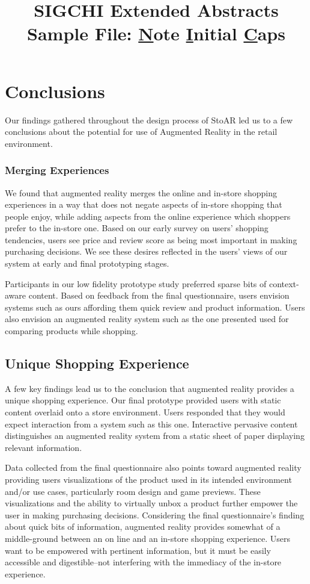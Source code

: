 \documentclass{sigchi-ext}
\begin{document}
\title{SIGCHI Extended Abstracts Sample File: \underline{N}ote
  \underline{I}nitial \underline{C}aps}

\section{Conclusions}

Our findings gathered throughout the design process of StoAR led us to a few conclusions about the potential for use of Augmented Reality in the retail environment.

\subsubsection{Merging Experiences}
We found that augmented reality merges the online and in-store shopping experiences in a way that does not negate aspects of in-store shopping that people enjoy, while adding aspects from the online experience which shoppers prefer to the in-store one.  Based on our early survey on users' shopping tendencies, users see price and review score as being most important in making purchasing decisions.  We see these desires reflected in the users' views of our system at early and final prototyping stages.

Participants in our low fidelity prototype study preferred sparse bits of context-aware content.  Based on feedback from the final questionnaire, users envision systems such as ours affording them quick review and product information.  Users also envision an augmented reality system such as the one presented used for comparing products while shopping.

\subsection{Unique Shopping Experience}
A few key findings lead us to the conclusion that augmented reality provides a unique shopping experience.  
Our final prototype provided users with static content overlaid onto a store environment.  Users responded that they would expect interaction from a system such as this one.  Interactive pervasive content distinguishes an augmented reality system from a static sheet of paper displaying relevant information.

Data collected from the final questionnaire also points toward augmented reality providing users visualizations of the product used in its intended environment and/or use cases, particularly room design and game previews.  These visualizations and the ability to virtually unbox a product further empower the user in making purchasing decisions.
Considering the final questionnaire's finding about quick bits of information, augmented reality provides somewhat of a middle-ground between an on line and an in-store shopping experience.  Users want to be empowered with pertinent information, but it must be easily accessible and digestible--not interfering with the immediacy of the in-store experience.
\end{document}
